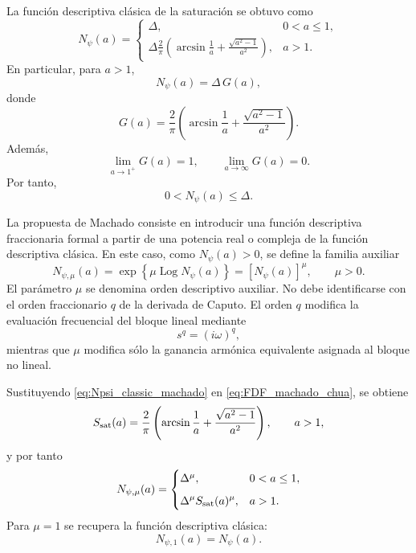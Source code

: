 \documentclass[journal]{IEEEtran}
\begin{document}
La función descriptiva clásica de la saturación se obtuvo como
\begin{equation}
\label{eq:Npsi_classic_machado}
N_\psi(a)
=
\begin{cases}
\Delta, & 0<a\leq 1,\\[2mm]
\displaystyle
\Delta\frac{2}{\pi}
\left(
\arcsin\frac1a+
\frac{\sqrt{a^2-1}}{a^2}
\right),
& a>1.
\end{cases}
\end{equation}
En particular, para \(a>1\),
\begin{equation}
\label{eq:Npsi_large_machado}
N_\psi(a)
=
\Delta\,G(a),
\end{equation}
donde
\begin{equation}
\label{eq:Gamp_machado}
G(a)
=
\frac{2}{\pi}
\left(
\arcsin\frac1a+
\frac{\sqrt{a^2-1}}{a^2}
\right).
\end{equation}
Además,
\begin{equation}
\label{eq:G_limits_machado}
\lim_{a\to 1^+}G(a)=1,
\qquad
\lim_{a\to\infty}G(a)=0.
\end{equation}
Por tanto,
\begin{equation}
\label{eq:Npsi_range_machado}
0<N_\psi(a)\leq \Delta.
\end{equation}

La propuesta de Machado consiste en introducir una función descriptiva
fraccionaria formal a partir de una potencia real o compleja de la función
descriptiva clásica. En este caso, como \(N_\psi(a)>0\), se define la familia
auxiliar
\begin{equation}
\label{eq:FDF_machado_chua}
N_{\psi,\mu}(a)
=
\exp\left\{
\mu\operatorname{Log}N_\psi(a)
\right\}
=
\left[N_\psi(a)\right]^\mu,
\qquad
\mu>0.
\end{equation}
El parámetro \(\mu\) se denomina orden descriptivo auxiliar. No debe
identificarse con el orden fraccionario \(q\) de la derivada de Caputo. El
orden \(q\) modifica la evaluación frecuencial del bloque lineal mediante
\[
s^q=(i\omega)^q,
\]
mientras que \(\mu\) modifica sólo la ganancia armónica equivalente asignada
al bloque no lineal.

Sustituyendo \eqref{eq:Npsi_classic_machado} en
\eqref{eq:FDF_machado_chua}, se obtiene
\begin{equation}
\label{eq:Ssat_machado}
S_{\rm sat}(a)
=
\frac{2}{\pi}
\left(
\arcsin\frac1a+
\frac{\sqrt{a^2-1}}{a^2}
\right),
\qquad a>1,
\end{equation}
y por tanto
\begin{equation}
\label{eq:Npsi_mu_piecewise_machado}
N_{\psi,\mu}(a)
=
\begin{cases}
\Delta^\mu,
& 0<a\leq 1,\\[2mm]
\displaystyle
\Delta^\mu S_{\rm sat}(a)^\mu,
& a>1.
\end{cases}
\end{equation}
Para \(\mu=1\) se recupera la función descriptiva clásica:
\begin{equation}
N_{\psi,1}(a)=N_\psi(a).
\end{equation}
\end{document}
